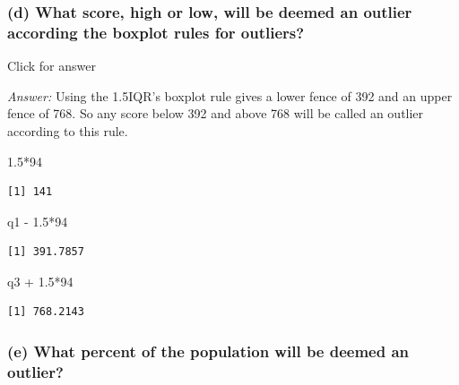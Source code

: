 \documentclass[
]{book}
\newenvironment{Shaded}{\begin{snugshade}}{\end{snugshade}}
\newcommand{\DecValTok}[1]{\textcolor[rgb]{0.00,0.00,0.81}{#1}}
\newcommand{\FloatTok}[1]{\textcolor[rgb]{0.00,0.00,0.81}{#1}}
\newcommand{\NormalTok}[1]{#1}
\newcommand{\SpecialCharTok}[1]{\textcolor[rgb]{0.00,0.00,0.00}{#1}}
\begin{document}
\hypertarget{d-what-score-high-or-low-will-be-deemed-an-outlier-according-the-boxplot-rules-for-outliers}{%
\subsubsection{(d) What score, high or low, will be deemed an outlier according the boxplot rules for outliers?}\label{d-what-score-high-or-low-will-be-deemed-an-outlier-according-the-boxplot-rules-for-outliers}}

Click for answer

\emph{Answer:} Using the 1.5IQR's boxplot rule gives a lower fence of 392 and an upper fence of 768. So any score below 392 and above 768 will be called an outlier according to this rule.

\begin{Shaded}
\begin{Highlighting}[]
\FloatTok{1.5}\SpecialCharTok{*}\DecValTok{94}
\end{Highlighting}
\end{Shaded}

\begin{verbatim}
[1] 141
\end{verbatim}

\begin{Shaded}
\begin{Highlighting}[]
\NormalTok{q1 }\SpecialCharTok{{-}} \FloatTok{1.5}\SpecialCharTok{*}\DecValTok{94}
\end{Highlighting}
\end{Shaded}

\begin{verbatim}
[1] 391.7857
\end{verbatim}

\begin{Shaded}
\begin{Highlighting}[]
\NormalTok{q3 }\SpecialCharTok{+} \FloatTok{1.5}\SpecialCharTok{*}\DecValTok{94}
\end{Highlighting}
\end{Shaded}

\begin{verbatim}
[1] 768.2143
\end{verbatim}

\hypertarget{e-what-percent-of-the-population-will-be-deemed-an-outlier}{%
\subsubsection{(e) What percent of the population will be deemed an outlier?}\label{e-what-percent-of-the-population-will-be-deemed-an-outlier}}
\end{document}
